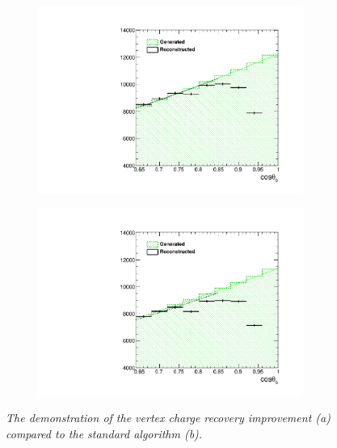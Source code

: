 \begin{figure}
	\centering
	\begin{subfigure}{0.5\textwidth}
		\includegraphics[width=0.95\textwidth]{ILD/plots/zoom-rec.pdf}
		\caption{\label{fig:BAsymmetryRecZ_a_3} }
	\end{subfigure}%
	\begin{subfigure}{0.5\textwidth}
		\centering
		\includegraphics[width=0.95\textwidth]{ILD/plots/zoom-norec.pdf}
		\caption{\label{fig:BAsymmetryRecZ_b_3} }
	\end{subfigure}
	\caption{\sl The demonstration of the vertex charge recovery improvement (a) compared to the standard algorithm (b). }
	\label{fig:BAsymmetryRecZ_3}
\end{figure}

